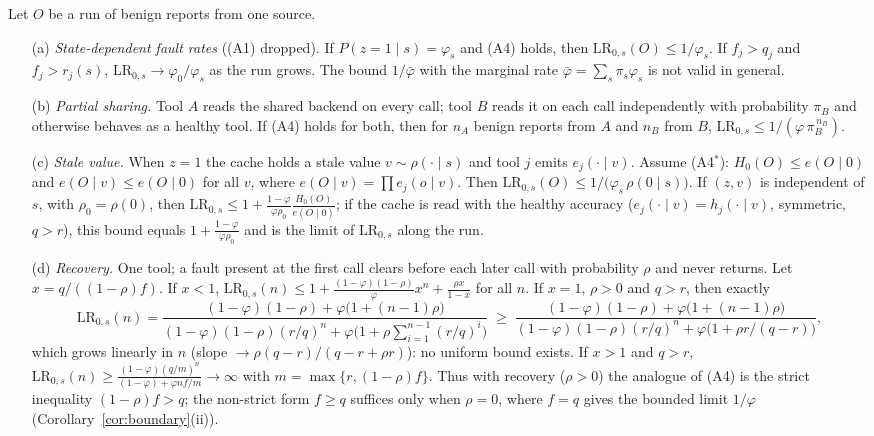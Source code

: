 \begin{proposition}\label{prop:beyond}
Let $O$ be a run of benign reports from one source.
\begin{enumerate}
\item[(a)] \emph{State-dependent fault rates} ((A1) dropped). If $P(z=1\mid s)=\varphi_s$ and (A4) holds, then
$\mathrm{LR}_{0,s}(O)\le 1/\varphi_s$. If $f_j>q_j$ and $f_j>r_j(s)$, $\mathrm{LR}_{0,s}\to\varphi_0/\varphi_s$ as the run
grows. The bound $1/\bar\varphi$ with the marginal rate $\bar\varphi=\sum_s\pi_s\varphi_s$ is not valid in general.
\item[(b)] \emph{Partial sharing.} Tool $A$ reads the shared backend on every call; tool $B$ reads it on each call
independently with probability $\pi_B$ and otherwise behaves as a healthy tool. If (A4) holds for both, then for
$n_A$ benign reports from $A$ and $n_B$ from $B$, $\mathrm{LR}_{0,s}\le 1/(\varphi\,\pi_B^{\,n_B})$.
\item[(c)] \emph{Stale value.} When $z=1$ the cache holds a stale value $v\sim\rho(\cdot\mid s)$ and tool $j$ emits
$e_j(\cdot\mid v)$. Assume (A4$^*$): $H_0(O)\le e(O\mid 0)$ and $e(O\mid v)\le e(O\mid 0)$ for all $v$, where
$e(O\mid v)=\prod e_j(o\mid v)$. Then $\mathrm{LR}_{0,s}(O)\le 1/\big(\varphi_s\,\rho(0\mid s)\big)$. If $(z,v)$ is
independent of $s$, with $\rho_0=\rho(0)$, then
$\mathrm{LR}_{0,s}\le 1+\frac{1-\varphi}{\varphi\rho_0}\frac{H_0(O)}{e(O\mid0)}$; if the cache is read with the healthy
accuracy ($e_j(\cdot\mid v)=h_j(\cdot\mid v)$, symmetric, $q>r$), this bound equals $1+\frac{1-\varphi}{\varphi\rho_0}$
and is the limit of $\mathrm{LR}_{0,s}$ along the run.
\item[(d)] \emph{Recovery.} One tool; a fault present at the first call clears before each later call with probability
$\rho$ and never returns. Let $x=q/((1-\rho)f)$. If $x<1$,
$\mathrm{LR}_{0,s}(n)\le 1+\frac{(1-\varphi)(1-\rho)}{\varphi}x^n+\frac{\rho x}{1-x}$ for all $n$. If $x=1$, $\rho>0$
and $q>r$, then exactly
\[
\mathrm{LR}_{0,s}(n)=\frac{(1-\varphi)(1-\rho)+\varphi\big(1+(n-1)\rho\big)}{(1-\varphi)(1-\rho)(r/q)^n+\varphi\big(1+\rho\sum_{i=1}^{n-1}(r/q)^i\big)}
\;\ge\;\frac{(1-\varphi)(1-\rho)+\varphi\big(1+(n-1)\rho\big)}{(1-\varphi)(1-\rho)(r/q)^n+\varphi\big(1+\rho r/(q-r)\big)},
\]
which grows linearly in $n$ (slope $\to\rho(q-r)/(q-r+\rho r)$): no uniform bound exists. If $x>1$ and $q>r$,
$\mathrm{LR}_{0,s}(n)\ge\frac{(1-\varphi)(q/m)^n}{(1-\varphi)+\varphi nf/m}\to\infty$ with $m=\max\{r,(1-\rho)f\}$.
Thus with recovery ($\rho>0$) the analogue of (A4) is the strict inequality $(1-\rho)f>q$; the non-strict form
$f\ge q$ suffices only when $\rho=0$, where $f=q$ gives the bounded limit $1/\varphi$ (Corollary~\ref{cor:boundary}(ii)).
\end{enumerate}
\end{proposition}

